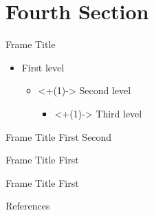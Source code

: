 \documentclass[169,9pt]{beamer}
\begin{document}
\section{Fourth Section}\sectionFrame

\begin{frame}{Frame Title}
    \begin{itemize}
        \item First level
        \begin{itemize}
            \item<+(1)-> Second level
            \begin{itemize}
                \item<+(1)-> Third level
            \end{itemize}
        \end{itemize}
    \end{itemize}
\end{frame}

\begin{frame}{Frame Title}
    First
    \pause
    Second
\end{frame}


\begin{frame}{Frame Title}
    First
\end{frame}


\begin{frame}{Frame Title}
    First
\end{frame}

\begin{frame}[allowframebreaks]{References}
    
\end{frame}

\appendix

\end{document}
